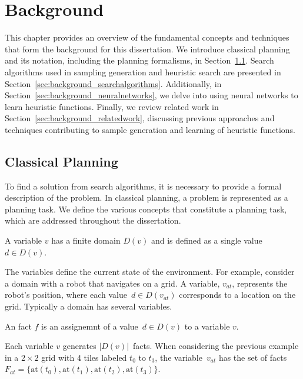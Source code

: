 \chapter{Background}
\label{sec:background}

This chapter provides an overview of the fundamental concepts and techniques that form the background for this dissertation. We introduce classical planning and its notation, including the planning formalisms, in Section~\ref{sec:background_classicalplanning}. Search algorithms used in sampling generation and heuristic search are presented in Section~\ref{sec:background_searchalgorithms}. Additionally, in Section~\ref{sec:background_neuralnetworks}, we delve into using neural networks to learn heuristic functions. Finally, we review related work in Section~\ref{sec:background_relatedwork}, discussing previous approaches and techniques contributing to sample generation and learning of heuristic functions.

\section{Classical Planning}
\label{sec:background_classicalplanning}

To find a solution from search algorithms, it is necessary to provide a formal description of the problem. In classical planning, a problem is represented as a planning task. We define the various concepts that constitute a planning task, which are addressed throughout the dissertation.

\begin{definition}[Variable]\label{def:variable}
    A variable $v$ has a finite domain $D(v)$ and is defined as a single value~$d \in D(v)$.
\end{definition}

The variables define the current state of the environment. For example, consider a domain with a robot that navigates on a grid. A variable, $v_{at}$, represents the robot's position, where each value~$d \in D(v_{at})$ corresponds to a location on the grid. Typically a domain has several variables.

\begin{definition}[Fact]\label{def:fact}
    An fact $f$ is an assignemnt of a value~$d \in D(v)$ to a variable $v$.
\end{definition}

Each variable $v$ generates $|D(v)|$~facts. When considering the previous example in a $2 \times 2$ grid with 4 tiles labeled $t_0$ to $t_3$, the variable~$v_{at}$ has the set of facts~$F_{at}=\{\text{at}(t_0),\text{at}(t_1),\text{at}(t_2),\text{at}(t_3)\}$.

